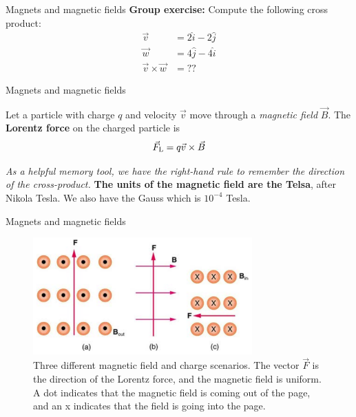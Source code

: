 \documentclass{beamer}
\begin{document}
\begin{frame}{Magnets and magnetic fields}
\textbf{Group exercise:} Compute the following cross product:
\begin{align}
\vec{v} &= 2\hat{i}-2\hat{j} \\
\vec{w} &= 4\hat{j}-4\hat{i} \\
\vec{v} \times \vec{w} &= ??
\end{align}
\end{frame}

\begin{frame}{Magnets and magnetic fields}
\begin{tcolorbox}[colback=white,colframe=black!100!black,title=The Lorentz Force]
\alert{Let a particle with charge $q$ and velocity $\vec{v}$ move through a \textit{magnetic field} $\vec{B}$.  The \textbf{Lorentz force} on the charged particle is
\begin{equation}
\vec{F}_{\rm L} = q\vec{v} \times \vec{B}
\label{eq:Lorentz}
\end{equation}}
\end{tcolorbox}
\textit{As a helpful memory tool, we have the right-hand rule to remember the direction of the cross-product.}  \textbf{The units of the magnetic field are the Telsa}, after Nikola Tesla.  We also have the Gauss which is $10^{-4}$ Tesla.
\end{frame}

\begin{frame}{Magnets and magnetic fields}
\begin{figure}
\centering
\includegraphics[width=0.75\textwidth]{figures/lorentzProblem.png}
\caption{\label{fig:lorentzProblem} Three different magnetic field and charge scenarios.  The vector $\vec{F}$ is the direction of the Lorentz force, and the magnetic field is uniform.  A dot indicates that the magnetic field is coming out of the page, and an x indicates that the field is going into the page.}
\end{figure}
\end{frame}
\end{document}
